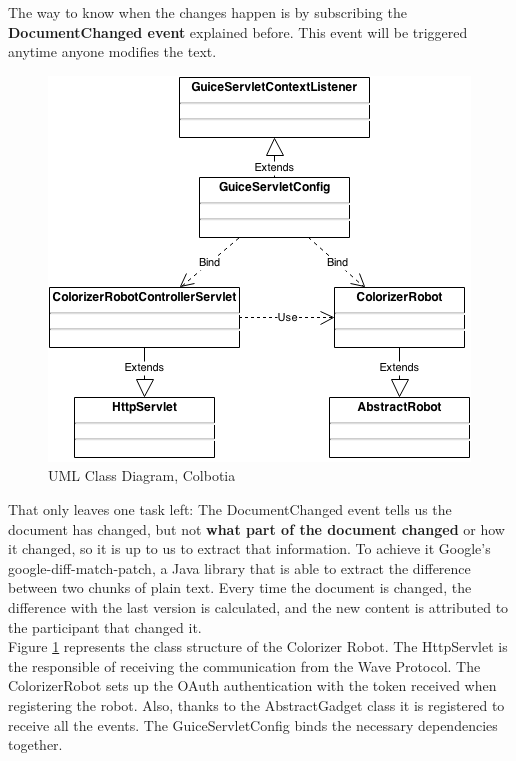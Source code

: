 The way to know when the changes happen is by subscribing the \textbf{DocumentChanged event} explained before. This event will be triggered anytime anyone modifies the text.\\[.2cm]
\begin{figure}[H]
  \center
    \includegraphics[keepaspectratio, scale=0.5]{Media/Diagrams/Robot/Colorizer.png}
  \caption{UML Class Diagram, Colbotia}
  \label{fig:colorizer_diagram}
\end{figure}
That only leaves one task left: The DocumentChanged event tells us the document has changed, but not \textbf{what part of the document changed} or how it changed, so it is up to us to extract that information. To achieve it Google's google-diff-match-patch, a Java library that is able to extract the difference between two chunks of plain text. Every time the document is changed, the difference with the last version is calculated, and the new content is attributed to the participant that changed it.\\[.2cm]
Figure \ref{fig:colorizer_diagram} represents the class structure of the Colorizer Robot. The HttpServlet is the responsible of receiving the communication from the Wave Protocol. The ColorizerRobot sets up the OAuth authentication with the token received when registering the robot. Also, thanks to the AbstractGadget class it is registered to receive all the events. The GuiceServletConfig binds the necessary dependencies together.
